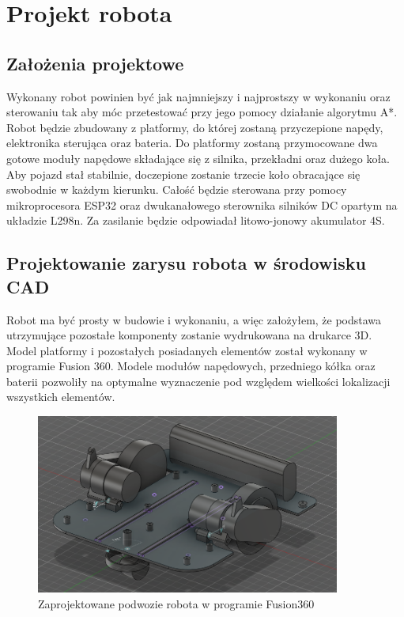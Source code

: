 \section{Projekt robota}
\subsection{Założenia projektowe}
Wykonany robot powinien być jak najmniejszy i najprostszy w wykonaniu oraz sterowaniu tak aby móc przetestować przy jego pomocy działanie algorytmu A*. 
Robot będzie zbudowany z platformy, do której zostaną przyczepione napędy, elektronika sterująca oraz bateria. 
Do platformy zostaną przymocowane dwa gotowe moduły napędowe składające się z silnika, przekładni oraz dużego koła. 
Aby pojazd stał stabilnie, doczepione zostanie trzecie koło obracające się swobodnie w każdym kierunku.
Całość będzie sterowana przy pomocy mikroprocesora ESP32 oraz dwukanałowego sterownika silników DC opartym na układzie L298n.
Za zasilanie będzie odpowiadał litowo-jonowy akumulator 4S.

\subsection{Projektowanie zarysu robota w środowisku CAD}
Robot ma być prosty w budowie i wykonaniu, a więc założyłem, że podstawa utrzymujące pozostałe komponenty
zostanie wydrukowana na drukarce 3D. Model platformy i pozostałych posiadanych elementów został wykonany w programie Fusion 360.
Modele modułów napędowych, przedniego kółka oraz baterii pozwoliły na optymalne wyznaczenie pod względem wielkości lokalizacji wszystkich elementów.


\begin{figure}[H]
	\centering
	\includegraphics[width=10cm]{pages/robot/zdjecia/robotModelCaly.png}
	\caption{Zaprojektowane podwozie robota w programie Fusion360}
	\label{fig:Rys}
\end{figure}

